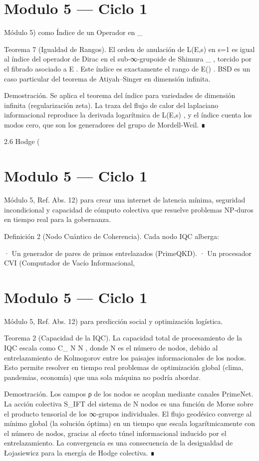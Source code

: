 \documentclass[12pt,twoside]{book}
\begin{document}
\chapter{Modulo 5 — Ciclo 1}
Módulo 5) como Índice de un Operador en  _{} 

Teorema 7 (Igualdad de Rangos). El orden de anulación de  L(E,s)  en  s=1  es igual al índice del operador de Dirac en el sub‑∞‑grupoide de Shimura  _{} , torcido por el fibrado asociado a  E . Este índice es exactamente el rango de  E() . BSD es un caso particular del teorema de Atiyah–Singer en dimensión infinita.

Demostración. Se aplica el teorema del índice para variedades de dimensión infinita (regularización zeta). La traza del flujo de calor del laplaciano informacional reproduce la derivada logarítmica de  L(E,s) , y el índice cuenta los modos cero, que son los generadores del grupo de Mordell‑Weil. ∎

2.6 Hodge (

\chapter{Modulo 5 — Ciclo 1}
Módulo 5, Ref. Abs. 12) para crear una internet de latencia mínima, seguridad incondicional y capacidad de cómputo colectiva que resuelve problemas NP‑duros en tiempo real para la gobernanza.

Definición 2 (Nodo Cuántico de Coherencia). Cada nodo IQC alberga:

· Un generador de pares de primos entrelazados (PrimeQKD).
· Un procesador CVI (Computador de Vacío Informacional, 

\chapter{Modulo 5 — Ciclo 1}
Módulo 5, Ref. Abs. 12) para predicción social y optimización logística.

Teorema 2 (Capacidad de la IQC). La capacidad total de procesamiento de la IQC escala como  C_{} \propto N \log N , donde N es el número de nodos, debido al entrelazamiento de Kolmogorov entre los paisajes informacionales de los nodos. Esto permite resolver en tiempo real problemas de optimización global (clima, pandemias, economía) que una sola máquina no podría abordar.

Demostración. Los campos ρ de los nodos se acoplan mediante canales PrimeNet. La acción colectiva S_IFT del sistema de N nodos es una función de Morse sobre el producto tensorial de los ∞‑grupos individuales. El flujo geodésico converge al mínimo global (la solución óptima) en un tiempo que escala logarítmicamente con el número de nodos, gracias al efecto túnel informacional inducido por el entrelazamiento. La convergencia es una consecuencia de la desigualdad de Łojasiewicz para la energía de Hodge colectiva. ∎
\end{document}
